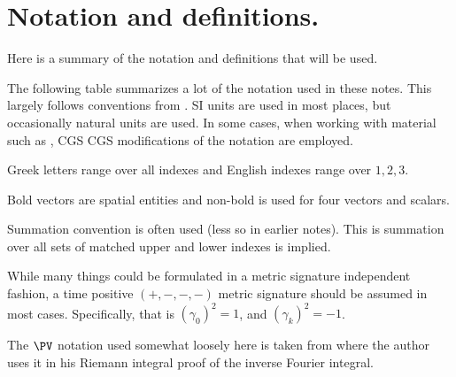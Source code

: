 \chapter{Notation and definitions.}\label{chap:notationTable}

Here is a summary of the notation and definitions that will be used.

The following table summarizes a lot of the notation used in these notes.
This largely follows conventions from \cite{doran2003gap}.  SI units are
used in most places, but occasionally natural units are used.  In
some cases, when working with material such as \cite{bohm1989qt}, CGS 
CGS modifications of the notation are employed.

Greek letters range over all indexes and English indexes range over $1,2,3$.

Bold vectors are spatial entities and non-bold is used for four vectors and scalars.

Summation convention is often used (less so in earlier notes).  This is 
summation over all sets of matched upper and lower indexes is implied.

While many things could be formulated in a metric signature independent
fashion, 
a time positive
$(+,-,-,-)$
metric signature should be assumed in most cases.  Specifically, that is $(\gamma_0)^2 = 1$, and $(\gamma_k)^2 = -1$.

The $\PV$ notation used somewhat loosely here is taken from \cite{lepage1980cva} where the author uses it in his Riemann integral proof of the inverse Fourier integral.


